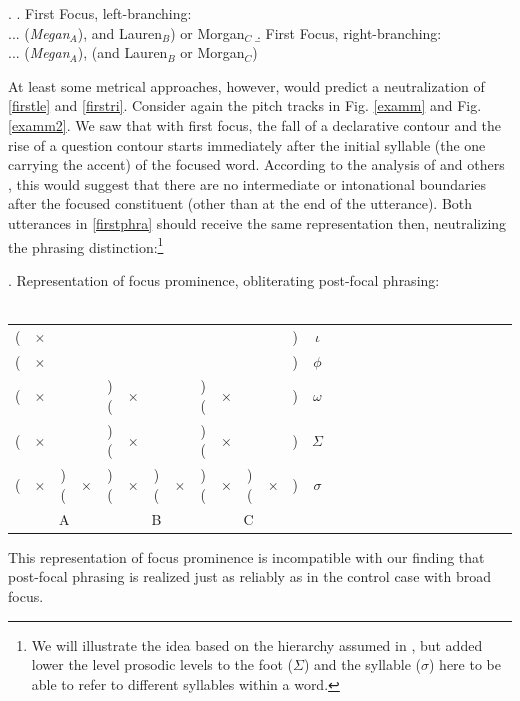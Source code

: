 \documentclass[preprint,review,12pt,authoryear,times]{elsarticle}
\newcommand{\g}{$\times$}
\begin{document}
\ex.\label{firstphra}
\a. First Focus, left-branching:\\
... ({\em Megan}$_A$), and Lauren$_B$) or Morgan$_C$\label{firstle}
\b. First Focus, right-branching:\\
 ... ({\em Megan}$_A$), (and {Lauren}$_B$ or Morgan$_C$)\label{firstri}
 
At least some metrical approaches, however, would predict a neutralization of \ref{firstle} and \ref{firstri}. Consider again the pitch tracks in Fig. \ref{examm} and Fig.  \ref{examm2}. We saw that with first focus, the fall of a declarative contour and the rise of a question contour starts immediately after the initial syllable (the one carrying the accent) of the focused word.  According to the analysis of \citet{pierr80} and others \citep[e.g.][]{beckm96}, this would suggest that there are no intermediate or intonational boundaries after the focused constituent (other than at the end of the utterance). Both utterances in \ref{firstphra} should receive the same representation then, neutralizing the phrasing distinction:\footnote{We will illustrate the idea based on the hierarchy assumed in \citet[][]{fery13}, but added lower the level prosodic levels to the foot ($\Sigma$) and the syllable ($\sigma$) here to be able to refer to different syllables within a word.}


\ex. Representation of focus prominence, obliterating post-focal phrasing:\\
\vspace{-10pt}\footnotesize
\ \\
\vspace{-12pt}
\setlength{\unitlength}{1cm}
\setlength\extrarowheight{-3pt}
\begin{tabular}{ccccccccccccccccccccccccccc}
 (&\g&&&&&&&&&&&)&\em $\iota$\\
(&\g&&&&&&&&&&&)&$\phi$\\
(&\g&&&)(&\g&&&)(&\g&&&)&$\omega$\\
(&\g&&&)(&\g&&&)(&\g&&&)&$\Sigma$\\
(&\g&)(&\g&)(&\g&)(&\g&)(&\g&)(&\g&)&$\sigma$\\
\multicolumn{5}{c}{A}&\multicolumn{3}{c}{B}&\multicolumn{5}{c}{C}\\
\end{tabular}
\vspace{15pt}

This representation of focus prominence is incompatible with our finding that post-focal phrasing is realized just as reliably as in the control case with broad focus. 
\end{document}
